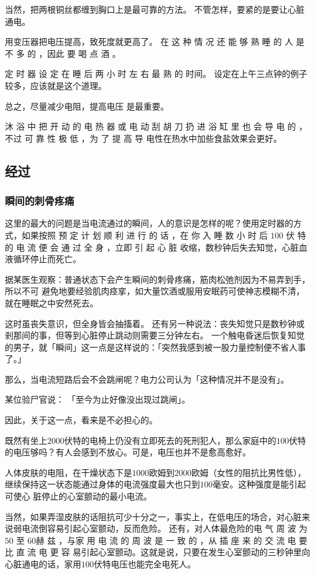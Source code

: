 \documentclass[UTF8]{ctexart}
\begin{document}
当然，把两根铜丝都缠到胸口上是最可靠的方法。 
不管怎样，要紧的是要让心脏通电。

用变压器把电压提高，致死度就更高了。 
在 这 种 情 况 还 能 够 熟 睡 的 人 是 不 多 的 ，因此 要 喝 点 酒 。

定 时 器 设 定 在 睡 后 两 小 时 左 右 最 熟 的 时间。
设定在上午三点钟的例子较多，应该就是这个道理。

总之，尽量减少电阻，提高电压 是最重要。

沐 浴 中 把 开 动 的 电 热 器 或 电 动 刮 胡 刀 扔 进 浴 缸 里 也 会 导 电 的 ，不过 可 靠 性 极 低 ，为 了 提 高 导 电性在热水中加些食盐效果会更好。

\subsection{经过}

\subsubsection*{瞬间的刺骨疼痛}

这里的最大的问题是当电流通过的瞬间，人的意识是怎样的呢？使用定时器的方式，如果按照 预 定 计 划 顺 利 进 行 的 话 ，在 你 入 睡 数 小 时 后 $100$ 伏 特 的 电 流 便 会 通 过 全 身 ，立即 引 起 心 脏 收缩，数秒钟后失去知觉，心脏血液循环停止而死亡。

据某医生观察：普通状态下会产生瞬间的刺骨疼痛，筋肉松弛剂因为不易弄到手，所以不可 避免地要经验肌肉痉挛，如大量饮酒或服用安眠药可使神志模糊不清，就在睡眠之中安然死去。

这时虽丧失意识，但全身皆会抽搐着。
还有另一种说法：丧失知觉只是数秒钟或剎那间的事，但等到心脏停止跳动则需要三分钟左右。
一个触电昏迷后恢复知觉的男子，就「瞬间」这一点是这样说的：「突然我感到被一股力量控制便不省人事了。」

那么，当电流短路后会不会跳闸呢？电力公司认为「这种情况并不是没有」。

某位验尸官说：
「至今为止好像没出现过跳闸」。

因此，关于这一点，看来是不必担心的。

既然有坐上$2000$伏特的电椅上仍没有立即死去的死刑犯人，那么家庭中的$100$伏特的电压够吗？有人会感到不放心。可是，电压也并不是愈高愈好。

人体皮肤的电阻，在干燥状态下是$1000$欧姆到$2000$欧姆（女性的阻抗比男性低），
继续保持这一状态能通过身体的电流强度最大也只到$100$毫安。这种强度是能引起可使心
脏停止的心室颤动的最小电流。

当然，如果弄湿皮肤的话阻抗可少十分之一，事实上，在低电压的场合，对心脏来说弱电流倒容易引起心室颤动，反而危险。
还有，对人体最危险的电 气 周 波 为 $50$ 至 $60$赫 兹 ，与家 用 电 流 的 周 波 是 一 致 的 ，从 插 座 来 的 交 流 电 要 比 直 流 电 更 容 易引起心室颤动。这就是说，只要在发生心室颤动的三秒钟里向心脏通电的话，家用$100$伏特电压也能完全电死人。
\end{document}
